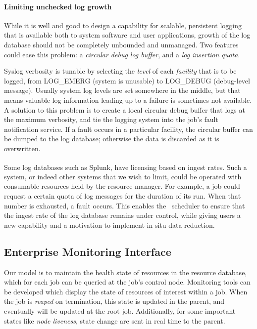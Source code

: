 \paragraph{Limiting unchecked log growth}
While it is well and good to design a capability for scalable, persistent
logging that is available both to system software and user applications,
growth of the log database should not be completely unbounded and unmanaged.
Two features could ease this problem: a {\em circular debug log buffer}, and
a {\em log insertion quota}.

Syslog verbosity is tunable by selecting the {\em level} of each
{\em facility} that is to be logged, from LOG\_EMERG (system is unusable)
to LOG\_DEBUG (debug-level message).  Usually system log levels are set
somewhere in the middle, but that means valuable log information leading
up to a failure is sometimes not available.  A solution to this problem is
to create a local circular debug buffer that logs at the maximum verbosity,
and tie the logging system into the job's fault notification service.
If a fault occurs in a particular facility, the circular buffer can be
dumped to the log database; otherwise the data is discarded as it is
overwritten.

Some log databases such as Splunk\textsuperscript{\textregistered},
have licensing based on ingest rates.  Such a system, or indeed other
systems that we wish to limit, could be operated with consumable resources
held by the resource manager.  For example, a job could request a certain
quota of log messages for the duration of its run.  When that number
is exhausted, a fault occurs.  This enables the \ngrm\ scheduler to ensure
that the ingest rate of the log database remains under control, while
giving users a new capability and a motivation to implement in-situ data
reduction.

\subsection{Enterprise Monitoring Interface}

Our model is to maintain the health state of resources in the resource
database, which for each job can be queried at the job's control node.
Monitoring tools can be developed which display the state of resources
of interest within a job.  When the job is {\em reaped} on termination,
this state is updated in the parent, and eventually will be updated
at the root job.  Additionally, for some important states like {\em node
liveness}, state change are sent in real time to the parent.

